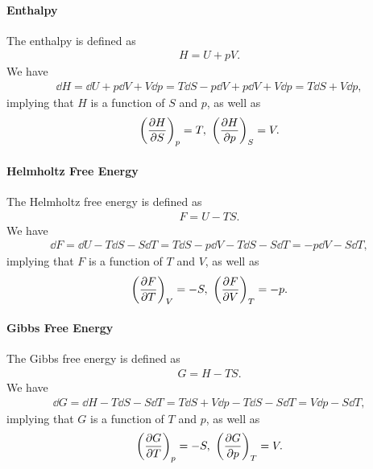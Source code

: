 
\paragraph{Enthalpy}
The enthalpy is defined as 
\begin{align*}
	H = U + pV.
\end{align*}
We have
\begin{align*}
	\dd{H} = \dd{U} + p\dd{V} + V\dd{p} = T\dd{S} - p\dd{V} + p\dd{V} + V\dd{p} = T\dd{S} + V\dd{p},
\end{align*}
implying that $H$ is a function of $S$ and $p$, as well as
\begin{align*}
	\left(\pdv{H}{S}\right)_{p} = T,\ \left(\pdv{H}{p}\right)_{S} = V.
\end{align*}

\paragraph{Helmholtz Free Energy}
The Helmholtz free energy is defined as
\begin{align*}
	F = U - TS.
\end{align*}
We have
\begin{align*}
	\dd{F} = \dd{U} - T\dd{S} - S\dd{T} = T\dd{S} - p\dd{V} - T\dd{S} - S\dd{T} = -p\dd{V} - S\dd{T},
\end{align*}
implying that $F$ is a function of $T$ and $V$, as well as
\begin{align*}
	\left(\pdv{F}{T}\right)_{V} = -S,\ \left(\pdv{F}{V}\right)_{T} = -p.
\end{align*}

\paragraph{Gibbs Free Energy}
The Gibbs free energy is defined as
\begin{align*}
	G = H - TS.
\end{align*}
We have
\begin{align*}
	\dd{G} = \dd{H} - T\dd{S} - S\dd{T} = T\dd{S} + V\dd{p} - T\dd{S} - S\dd{T} = V\dd{p} - S\dd{T},
\end{align*}
implying that $G$ is a function of $T$ and $p$, as well as
\begin{align*}
	\left(\pdv{G}{T}\right)_{p} = -S,\ \left(\pdv{G}{p}\right)_{T} = V.
\end{align*}


